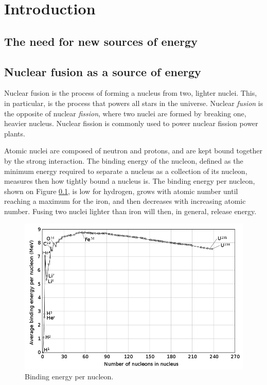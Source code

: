 \documentclass[my_thesis.tex]{subfiles}
\begin{document}
\cleardoublepage
\chapter*{Introduction}

\section{The need for new sources of energy}



\section{Nuclear fusion as a source of energy}
Nuclear fusion is the process of forming a nucleus from two, lighter nuclei. This, in particular, is the process that powers all stars in the universe. Nuclear \emph{fusion} is the opposite of nuclear \emph{fission}, where two nuclei are formed by breaking one, heavier nucleus. Nuclear fission is commonly used to power nuclear fission power plants.

Atomic nuclei are composed of neutron and protons, and are kept bound together by the strong interaction. The binding energy of the nucleon, defined as the minimum energy required to separate a nucleus as a collection of its nucleon, measures then how tightly bound a nucleus is. The binding energy per nucleon, shown on Figure \ref{fig. binding energy}, is low for hydrogen, grows with atomic number until reaching a maximum for the iron, and then decreases with increasing atomic number. Fusing two nuclei lighter than iron will then, in general, release energy.

\begin{figure}
    \centering
    \includegraphics[width=.75\linewidth]{images/introduction/BindingEnergy.png}
    \caption{Binding energy per nucleon.}
    \label{fig. binding energy}
\end{figure}
\end{document}
